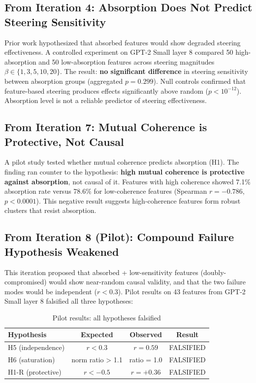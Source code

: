 \documentclass{article}
\begin{document}
\subsection{From Iteration 4: Absorption Does Not Predict Steering Sensitivity}

Prior work hypothesized that absorbed features would show degraded steering effectiveness. A controlled experiment on GPT-2 Small layer 8 compared 50 high-absorption and 50 low-absorption features across steering magnitudes $\beta \in \{1, 3, 5, 10, 20\}$. The result: \textbf{no significant difference} in steering sensitivity between absorption groups (aggregated $p = 0.299$). Null controls confirmed that feature-based steering produces effects significantly above random ($p < 10^{-12}$). Absorption level is not a reliable predictor of steering effectiveness.

\subsection{From Iteration 7: Mutual Coherence is Protective, Not Causal}

A pilot study tested whether mutual coherence predicts absorption (H1). The finding ran counter to the hypothesis: \textbf{high mutual coherence is protective against absorption}, not causal of it. Features with high coherence showed 7.1\% absorption rate versus 78.6\% for low-coherence features (Spearman $r = -0.786$, $p < 0.0001$). This negative result suggests high-coherence features form robust clusters that resist absorption.

\subsection{From Iteration 8 (Pilot): Compound Failure Hypothesis Weakened}

This iteration proposed that absorbed + low-sensitivity features (doubly-compromised) would show near-random causal validity, and that the two failure modes would be independent ($r < 0.3$). Pilot results on 43 features from GPT-2 Small layer 8 falsified all three hypotheses:

\begin{table}[htbp]
\caption{Pilot results: all hypotheses falsified}
\label{tab:hypotheses}
\centering
\begin{tabular}{lccc}
\toprule
Hypothesis & Expected & Observed & Result \\
\midrule
H5 (independence) & $r < 0.3$ & $r = 0.59$ & FALSIFIED \\
H6 (saturation) & norm ratio > 1.1 & ratio = 1.0 & FALSIFIED \\
H1-R (protective) & $r < -0.5$ & $r = +0.36$ & FALSIFIED \\
\bottomrule
\end{tabular}
\end{table}
\end{document}
